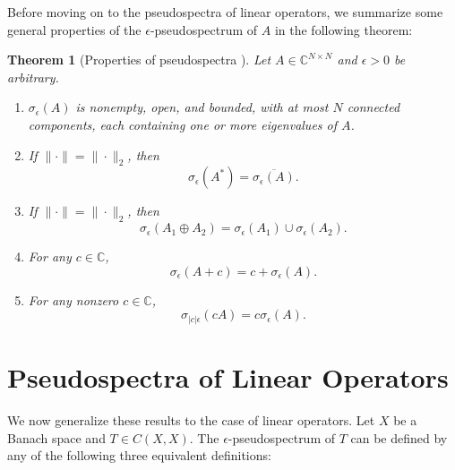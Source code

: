\documentclass[12pt,a4paper]{article}
\theoremstyle{boldthm}
\newtheorem{theorem}{Theorem}[section]
\theoremstyle{bolddefn}
\begin{document}
Before moving on to the pseudospectra of linear operators, we summarize some general properties of the $\epsilon$-pseudospectrum of $A$ in the following theorem:
\begin{theorem}[{Properties of pseudospectra \cite[Theorem 2.4]{Nick}}]
    Let $A\in \mathbb{C}^{N\times N}$ and $\epsilon>0$ be arbitrary.
    \begin{enumerate}
        \item $\sigma_\epsilon(A)$ is nonempty, open, and bounded, with at most $N$ connected components, each containing one or more eigenvalues of $A$.

        \item If $\|\cdot\|=\|\cdot\|_2$, then
        \[
            \sigma_\epsilon(A^*)=\overline{\sigma_\epsilon(A)}.
        \]

        \item If $\|\cdot\|=\|\cdot\|_2$, then
        \[
            \sigma_\epsilon(A_1\oplus A_2)
            =
            \sigma_\epsilon(A_1)\cup \sigma_\epsilon(A_2).
        \]

        \item For any $c\in\mathbb{C}$,
        \[
            \sigma_\epsilon(A+c)=c+\sigma_\epsilon(A).
        \]

        \item For any nonzero $c\in\mathbb{C}$,
        \[
            \sigma_{|c|\epsilon}(cA)=c\sigma_\epsilon(A).
        \]
    \end{enumerate}
\end{theorem}

\section{Pseudospectra of Linear Operators}

We now generalize these results to the case of linear operators. Let $X$ be a Banach space and $T \in C(X, X).$ The $\epsilon$-pseudospectrum of $T$ can be defined by any of the following three equivalent definitions:
\end{document}
